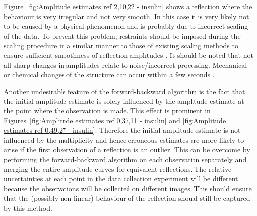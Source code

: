 Figure~\ref{fig:Amplitude estimates ref 2,10,22 - insulin} shows a reflection where the behaviour is very irregular and not very smooth.
In this case it is very likely not to be caused by a physical phenomenon and is probably due to incorrect scaling of the data.
To prevent this problem, restraints should be imposed during the scaling procedure in a similar manner to those of existing scaling methods to ensure sufficient smoothness of reflection amplitudes \cite{evans2013,kabsch2010integration}.
It should be noted that not all sharp changes in amplitudes relate to noise/incorrect processing.
Mechanical or chemical changes of the structure can occur within a few seconds \cite{allan2012}.

Another undesirable feature of the forward-backward algorithm is the fact that the initial amplitude estimate is solely influenced by the amplitude estimate at the point where the observation is made.
This effect is prominent in Figures~\ref{fig:Amplitude estimates ref 0,37,11 - insulin} and \ref{fig:Amplitude estimates ref 0,49,27 - insulin}.
Therefore the initial amplitude estimate is not influenced by the multiplicity and hence erroneous estimates are more likely to arise if the first observation of a reflection is an outlier.
This can be overcome by performing the forward-backward algorithm on each observation separately and merging the entire amplitude curves for equivalent reflections.
The relative uncertainties at each point in the data collection experiment will be different because the observations will be collected on different images.
This should ensure that the (possibly non-linear) behaviour of the reflection should still be captured by this method.
